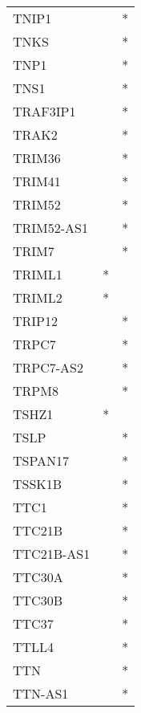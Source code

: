 \begin{longtable}{lcc}
TNIP1           &                &          * \\
TNKS            &                &          * \\
TNP1            &                &          * \\
TNS1            &                &          * \\
TRAF3IP1        &                &          * \\
TRAK2           &                &          * \\
TRIM36          &                &          * \\
TRIM41          &                &          * \\
TRIM52          &                &          * \\
TRIM52-AS1      &                &          * \\
TRIM7           &                &          * \\
TRIML1          &              * &            \\
TRIML2          &              * &            \\
TRIP12          &                &          * \\
TRPC7           &                &          * \\
TRPC7-AS2       &                &          * \\
TRPM8           &                &          * \\
TSHZ1           &              * &            \\
TSLP            &                &          * \\
TSPAN17         &                &          * \\
TSSK1B          &                &          * \\
TTC1            &                &          * \\
TTC21B          &                &          * \\
TTC21B-AS1      &                &          * \\
TTC30A          &                &          * \\
TTC30B          &                &          * \\
TTC37           &                &          * \\
TTLL4           &                &          * \\
TTN             &                &          * \\
TTN-AS1         &                &          * \\

\end{longtable}
